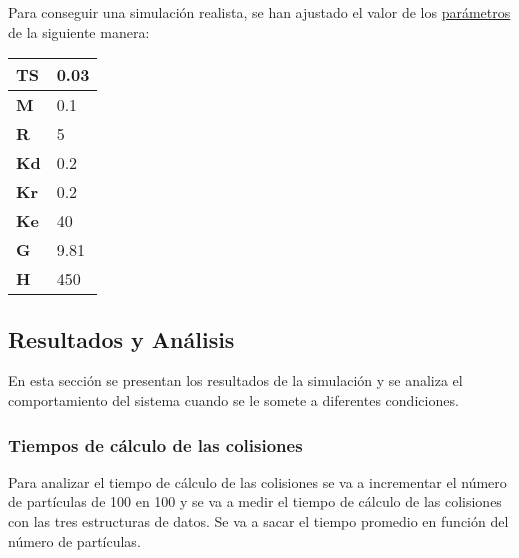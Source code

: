 \documentclass{article}
\begin{document}
Para conseguir una simulación realista, se han ajustado el valor de los \hyperref[sec:parametros]{parámetros} de la siguiente manera:

\begin{table}[h]
    \centering
    \begin{tabular}{|l|l|}
        \hline
        \textbf{TS} & 0.03 \\ \hline
        \textbf{M}  & 0.1  \\ \hline
        \textbf{R}  & 5    \\ \hline
        \textbf{Kd} & 0.2  \\ \hline
        \textbf{Kr} & 0.2  \\ \hline
        \textbf{Ke} & 40   \\ \hline
        \textbf{G}  & 9.81 \\ \hline
        \textbf{H}  & 450  \\ \hline
    \end{tabular}
\end{table}


\subsection{Resultados y Análisis}\label{sec:fb-resultados}
En esta sección se presentan los resultados de la simulación y se analiza el comportamiento del sistema cuando se le somete a diferentes condiciones.
\subsubsection{Tiempos de cálculo de las colisiones}\label{sec:fb-tiempos-general}
Para analizar el tiempo de cálculo de las colisiones se va a incrementar el número de partículas de 100 en 100 y se va a medir el tiempo de cálculo de las colisiones con las tres estructuras de datos. Se va a sacar el tiempo promedio en función del número de partículas.
\end{document}
